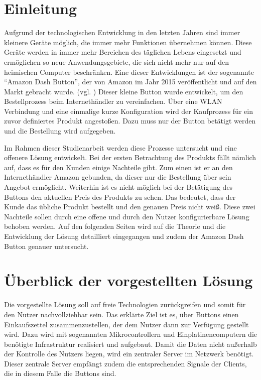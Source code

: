 \documentclass[ngerman]{scrartcl} %
\begin{document}
\tableofcontents
\newpage
 
\section{Einleitung}        
\label{sec:Einleitung-1}       
Aufgrund der technologischen Entwicklung in den letzten Jahren sind immer kleinere Geräte möglich, die immer mehr Funktionen übernehmen können. Diese Geräte werden in immer mehr Bereichen des täglichen Lebens eingesetzt und ermöglichen so neue Anwendungsgebiete, die sich nicht mehr nur auf den heimischen Computer beschränken. Eine dieser Entwicklungen ist der sogenannte ``Amazon Dash Button'', der von Amazon im Jahr 2015 veröffentlicht und auf den Markt gebracht wurde. (vgl. \cite{Amazon.})
Dieser kleine Button wurde entwickelt, um den Bestellprozess beim Internethändler zu vereinfachen. Über eine WLAN Verbindung und eine einmalige kurze Konfiguration wird der Kaufprozess für ein zuvor definiertes Produkt angestoßen. Dazu muss nur der Button betätigt werden und die Bestellung wird aufgegeben. 

Im Rahmen dieser Studienarbeit werden diese Prozesse untersucht und eine offenere Lösung entwickelt. Bei der ersten Betrachtung des Produkts fällt nämlich auf, dass es für den Kunden einige Nachteile gibt. Zum einen ist er an den Internethändler Amazon gebunden, da dieser nur die Bestellung über sein Angebot ermöglicht. Weiterhin ist es nicht möglich bei der Betätigung des Buttons den aktuellen Preis des Produkts zu sehen. Das bedeutet, dass der Kunde das übliche Produkt bestellt und den genauen Preis nicht weiß. Diese zwei Nachteile sollen durch eine offene und durch den Nutzer konfigurierbare Lösung behoben werden. Auf den folgenden Seiten wird auf die Theorie und die Entwicklung der Lösung detailliert eingegangen und zudem der Amazon Dash Button genauer untersucht.

\newpage
\section{Überblick der vorgestellten Lösung}
\label{sec:Überblick der vorgestellten Lösung-1}
Die vorgestellte Lösung soll auf freie Technologien zurückgreifen und somit für den Nutzer nachvollziehbar sein. Das erklärte Ziel ist es, über Buttons einen Einkaufszettel zusammenzustellen, der dem Nutzer dann zur Verfügung gestellt wird. Dazu wird mit sogenannten Mikrocontrollern und Einplatinencomputern die benötigte Infrastruktur realisiert und aufgebaut. Damit die Daten nicht außerhalb der Kontrolle des Nutzers liegen, wird ein zentraler Server im Netzwerk benötigt. Dieser zentrale Server empfängt zudem die entsprechenden Signale der Clients, die in diesem Falle die Buttons sind. 
\end{document}
